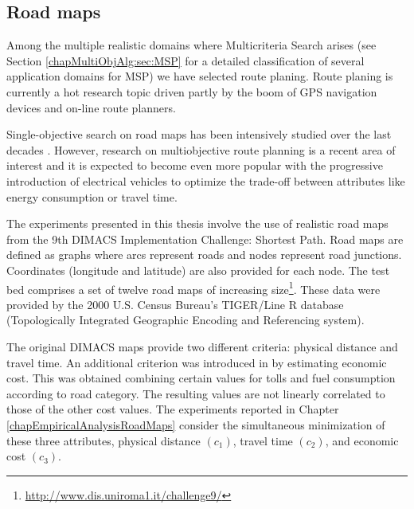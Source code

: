 \subsection{Road maps}
\label{chapMultiObjTestBeds:subsec:RoadMaps}

Among the multiple realistic domains where Multicriteria Search arises (see Section \ref{chapMultiObjAlg:sec:MSP} for a detailed classification of several application domains for MSP) we have selected route planing. Route planing is currently a hot research topic driven partly by the boom of GPS navigation devices and on-line route planners.

Single-objective search on road maps has been intensively studied over the last decades \citep{Pearl1984,Zhan1998a,Klunder2006,Geisberger2008,schultes2008,Delling2009a}. However, research on multiobjective route planning is a recent area of interest \citep{Delling2009,Raith2009a,Machuca2011,Machuca2011b, Mali2012} and it is expected to become even more popular with the progressive introduction of electrical vehicles \citep{Baum2014, Goodrich2014} to optimize the trade-off between attributes like energy consumption or travel time. 

The experiments presented in this thesis involve the use of realistic road maps from the 9th DIMACS Implementation Challenge: Shortest Path. Road maps are defined as graphs where arcs represent roads and nodes represent road junctions. Coordinates (longitude and latitude) are also provided for each node. The test bed comprises a set of twelve road maps of increasing size\footnote{\url{http://www.dis.uniroma1.it/challenge9/}}. These data were provided by the 2000 U.S. Census Bureau's TIGER/Line R database (Topologically Integrated Geographic Encoding and Referencing system). 

The original DIMACS maps provide two different criteria: physical distance and travel time. An additional criterion was introduced in \citet{Machuca2011} by estimating economic cost. This was obtained combining certain values for tolls and fuel consumption according to road category. The resulting values are not linearly correlated to those of the other cost values. The experiments reported in Chapter \ref{chapEmpiricalAnalysisRoadMaps} consider the simultaneous minimization of these three attributes, physical distance $(c_1)$, travel time $(c_2)$, and economic cost $(c_3)$.  

